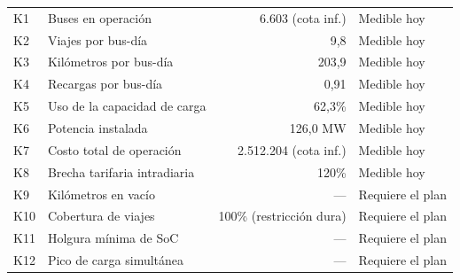 
\begin{tabular}{l L{5.2cm} r l}
\thead{} &  &  &  \\
\midrule
K1 & Buses en operación & 6.603 (cota inf.) & Medible hoy \\
K2 & Viajes por bus-día & 9{,}8 & Medible hoy \\
K3 & Kilómetros por bus-día & 203{,}9 & Medible hoy \\
K4 & Recargas por bus-día & 0{,}91 & Medible hoy \\
K5 & Uso de la capacidad de carga & 62{,}3\% & Medible hoy \\
K6 & Potencia instalada & 126{,}0 MW & Medible hoy \\
K7 & Costo total de operación & 2.512.204 (cota inf.) & Medible hoy \\
K8 & Brecha tarifaria intradiaria & 120\% & Medible hoy \\
K9 & Kilómetros en vacío & --- & Requiere el plan \\
K10 & Cobertura de viajes & 100\% (restricción dura) & Requiere el plan \\
K11 & Holgura mínima de SoC & --- & Requiere el plan \\
K12 & Pico de carga simultánea & --- & Requiere el plan \\
\bottomrule
\end{tabular}
